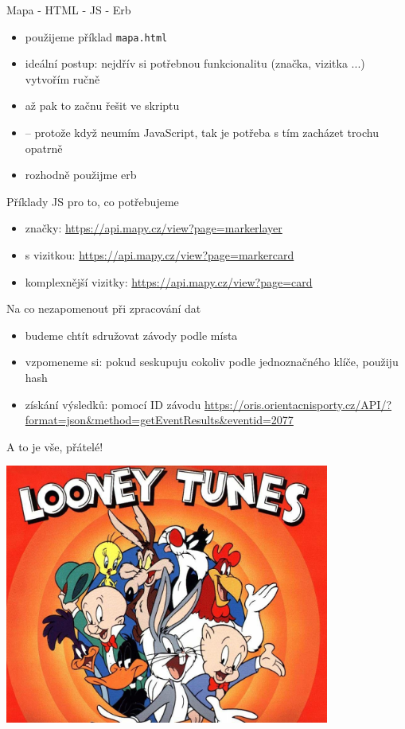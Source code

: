 \documentclass{beamer}
\begin{document}
\begin{frame}{Mapa - HTML - JS - Erb}
  \begin{itemize}
    \item použijeme příklad \texttt{mapa.html}
    \item ideální postup: nejdřív si potřebnou funkcionalitu (značka, vizitka ...) vytvořím ručně
    \item až pak to začnu řešit ve skriptu
    \item -- protože když neumím JavaScript, tak je potřeba s tím zacházet trochu opatrně
    \item rozhodně použijme erb
  \end{itemize}
\end{frame}

\begin{frame}{Příklady JS pro to, co potřebujeme}
  \begin{itemize}
    \item značky: \url{https://api.mapy.cz/view?page=markerlayer}
    \item s vizitkou: \url{https://api.mapy.cz/view?page=markercard}
    \item komplexnější vizitky: \url{https://api.mapy.cz/view?page=card}
  \end{itemize}
\end{frame}

\begin{frame}{Na co nezapomenout při zpracování dat}
  \begin{itemize}
    \item budeme chtít sdružovat závody podle místa
    \item vzpomeneme si: pokud seskupuju cokoliv podle jednoznačného klíče, použiju hash
    \item získání výsledků: pomocí ID závodu \url{https://oris.orientacnisporty.cz/API/?format=json&method=getEventResults&eventid=2077}
  \end{itemize}
\end{frame}

\begin{frame}{A to je vše, přátelé!}
  \begin{center}
    \includegraphics[width=0.8\textwidth]{looney_tunes}
  \end{center}
\end{frame}
\end{document}
